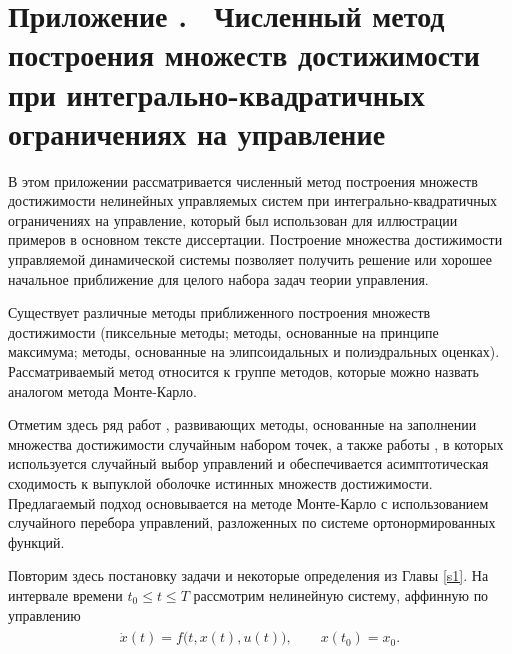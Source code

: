 \documentclass[../main.tex]{subfiles}
\begin{document}
\clearpage
\setcounter{section}{0}%
\renewcommand{\thesection}{\Alph{section}}%
\section*{Приложение .  Численный метод построения множеств достижимости при интегрально-квадратичных ограничениях на управление}%
\label{app:A}%
\renewcommand{\theequation}{\Alph{section}.\arabic{equation}}%
\setcounter{equation}{0}
  В этом приложении рассматривается численный метод построения множеств достижимости нелинейных управляемых систем при интегрально-квадратичных ограничениях на управление, который был использован для иллюстрации примеров в основном тексте диссертации. 
  Построение множества достижимости управляемой динамической системы позволяет получить решение или хорошее начальное
  приближение для целого набора задач теории управления. 
  
  
  Существует различные методы приближенного построения  множеств достижимости (пиксельные методы; методы, основанные на принципе максимума; методы, основанные на элипсоидальных и полиэдральных оценках).  
  Рассматриваемый метод относится к группе методов, которые можно назвать аналогом метода Монте-Карло. 
   
  Отметим здесь ряд работ \cite{Gornov2015, Gornov2017}, развивающих методы, основанные на заполнении множества достижимости случайным набором точек, а также работы \cite{Lew2020, Lew2022}, в которых используется случайный выбор управлений и обеспечивается асимптотическая сходимость к выпуклой оболочке истинных множеств достижимости.
  Предлагаемый подход основывается на методе Монте-Карло с использованием случайного перебора управлений, разложенных по системе ортонормированных функций.
  
  Повторим здесь постановку задачи и некоторые определения из Главы \ref{s1}.
  На интервале времени $ t_0 \leqslant t \leqslant {T} $ рассмотрим нелинейную систему, аффинную по управлению
  \begin{gather}\label{a1:common_nonlinear}
  	\begin{gathered}
  		\dot{x}(t)=f\big(t, x(t), u(t)\big), \qquad x(t_0) = x_0.
  	\end{gathered}
  \end{gather}
  
\end{document}
